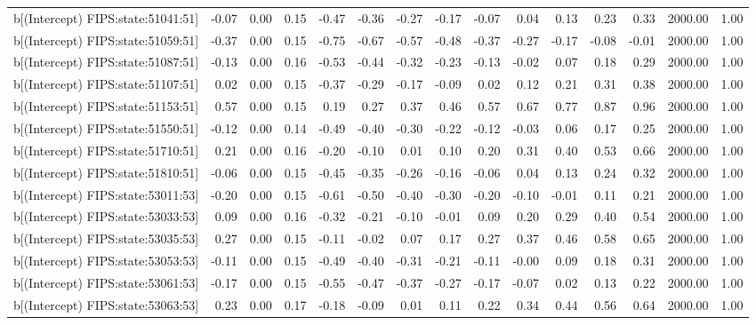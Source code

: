 \begin{table}[ht]
\begin{tabular}{rrrrrrrrrrrrrrr}
  b[(Intercept) FIPS:state:51041:51] & -0.07 & 0.00 & 0.15 & -0.47 & -0.36 & -0.27 & -0.17 & -0.07 & 0.04 & 0.13 & 0.23 & 0.33 & 2000.00 & 1.00 \\ 
  b[(Intercept) FIPS:state:51059:51] & -0.37 & 0.00 & 0.15 & -0.75 & -0.67 & -0.57 & -0.48 & -0.37 & -0.27 & -0.17 & -0.08 & -0.01 & 2000.00 & 1.00 \\ 
  b[(Intercept) FIPS:state:51087:51] & -0.13 & 0.00 & 0.16 & -0.53 & -0.44 & -0.32 & -0.23 & -0.13 & -0.02 & 0.07 & 0.18 & 0.29 & 2000.00 & 1.00 \\ 
  b[(Intercept) FIPS:state:51107:51] & 0.02 & 0.00 & 0.15 & -0.37 & -0.29 & -0.17 & -0.09 & 0.02 & 0.12 & 0.21 & 0.31 & 0.38 & 2000.00 & 1.00 \\ 
  b[(Intercept) FIPS:state:51153:51] & 0.57 & 0.00 & 0.15 & 0.19 & 0.27 & 0.37 & 0.46 & 0.57 & 0.67 & 0.77 & 0.87 & 0.96 & 2000.00 & 1.00 \\ 
  b[(Intercept) FIPS:state:51550:51] & -0.12 & 0.00 & 0.14 & -0.49 & -0.40 & -0.30 & -0.22 & -0.12 & -0.03 & 0.06 & 0.17 & 0.25 & 2000.00 & 1.00 \\ 
  b[(Intercept) FIPS:state:51710:51] & 0.21 & 0.00 & 0.16 & -0.20 & -0.10 & 0.01 & 0.10 & 0.20 & 0.31 & 0.40 & 0.53 & 0.66 & 2000.00 & 1.00 \\ 
  b[(Intercept) FIPS:state:51810:51] & -0.06 & 0.00 & 0.15 & -0.45 & -0.35 & -0.26 & -0.16 & -0.06 & 0.04 & 0.13 & 0.24 & 0.32 & 2000.00 & 1.00 \\ 
  b[(Intercept) FIPS:state:53011:53] & -0.20 & 0.00 & 0.15 & -0.61 & -0.50 & -0.40 & -0.30 & -0.20 & -0.10 & -0.01 & 0.11 & 0.21 & 2000.00 & 1.00 \\ 
  b[(Intercept) FIPS:state:53033:53] & 0.09 & 0.00 & 0.16 & -0.32 & -0.21 & -0.10 & -0.01 & 0.09 & 0.20 & 0.29 & 0.40 & 0.54 & 2000.00 & 1.00 \\ 
  b[(Intercept) FIPS:state:53035:53] & 0.27 & 0.00 & 0.15 & -0.11 & -0.02 & 0.07 & 0.17 & 0.27 & 0.37 & 0.46 & 0.58 & 0.65 & 2000.00 & 1.00 \\ 
  b[(Intercept) FIPS:state:53053:53] & -0.11 & 0.00 & 0.15 & -0.49 & -0.40 & -0.31 & -0.21 & -0.11 & -0.00 & 0.09 & 0.18 & 0.31 & 2000.00 & 1.00 \\ 
  b[(Intercept) FIPS:state:53061:53] & -0.17 & 0.00 & 0.15 & -0.55 & -0.47 & -0.37 & -0.27 & -0.17 & -0.07 & 0.02 & 0.13 & 0.22 & 2000.00 & 1.00 \\ 
  b[(Intercept) FIPS:state:53063:53] & 0.23 & 0.00 & 0.17 & -0.18 & -0.09 & 0.01 & 0.11 & 0.22 & 0.34 & 0.44 & 0.56 & 0.64 & 2000.00 & 1.00 \\ 

\end{tabular}
\end{table}
